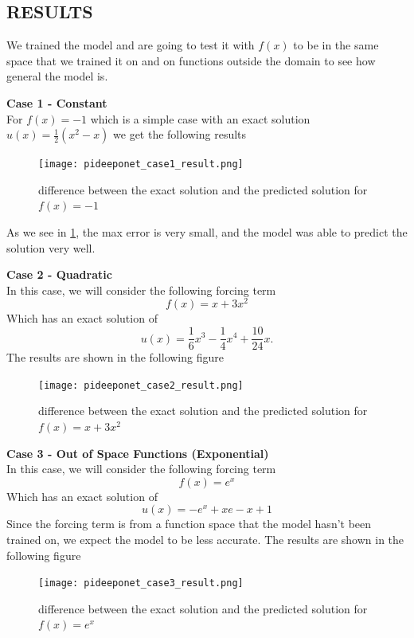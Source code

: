 \documentclass[a4paper, onecolumn, 12pt]{article}
\begin{document}
\subsection{RESULTS}
We trained the model and are going to test it with $f(x)$ to be in the same space that we trained it on
and on functions outside the domain to see how general the model is.

\textbf{Case 1 - Constant}\\
For $f(x) = -1$ which is a simple case with an exact solution $u(x) = \frac{1}{2} (x^2 - x)$ we get the following results 

\begin{figure}[H]
    \centering 
    \texttt{[image: pideeponet\_case1\_result.png]}
    \label{constant_f}
    \caption[figure1]{difference between the exact solution and the predicted solution for $f(x) = -1$}
\end{figure}

As we see in \ref*{constant_f}, the max error is very small, and the model 
was able to predict the solution very well.

\textbf{Case 2 - Quadratic}\\
In this case, we will consider the following forcing term
\[ f(x) = x + 3x^2 \] 
Which has an exact solution of 
\[u(x) = \dfrac{1}{6} x^3 - \dfrac{1}{4} x^4 + \dfrac{10}{24} x. \] 
The results are shown in the following figure

\begin{figure}[H]
    \centering 
    \texttt{[image: pideeponet\_case2\_result.png]}
    \label{quadratic_f}
    \caption[figure2]{difference between the exact solution and the predicted solution for $f(x) = x + 3x^2$}
\end{figure}


\textbf{Case 3 - Out of Space Functions (Exponential)}\\
In this case, we will consider the following forcing term
\[f(x) = e^x\] 
Which has an exact solution of 
\[u(x) = - e^x +xe -x + 1\]
Since the forcing term is from a function space that the model hasn't been trained on, 
we expect the model to be less accurate. The results are shown in the following figure

\begin{figure}[H]
    \centering 
    \texttt{[image: pideeponet\_case3\_result.png]}
    \label{exp_f}
    \caption[figure3]{difference between the exact solution and the predicted solution for $f(x) = e^x$}
\end{figure}
\end{document}
